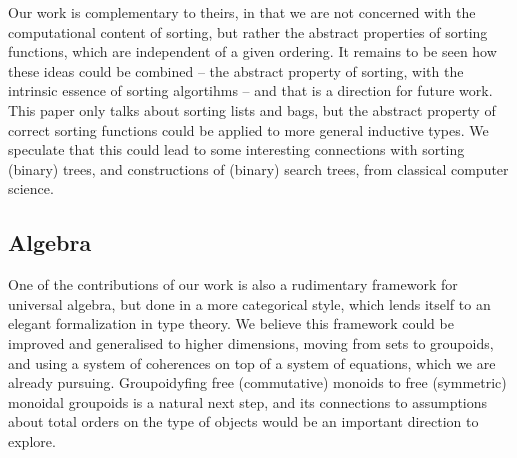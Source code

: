 Our work is complementary to theirs, in that we are not concerned with the computational content of sorting, but rather
the abstract properties of sorting functions, which are independent of a given ordering.
%
It remains to be seen how these ideas could be combined -- the abstract property of sorting, with the intrinsic essence
of sorting algortihms -- and that is a direction for future work.
%
This paper only talks about sorting lists and bags, but the abstract property of correct sorting functions could be
applied to more general inductive types. We speculate that this could lead to some interesting connections with sorting
(binary) trees, and constructions of (binary) search trees, from classical computer science.

\subsection*{Algebra}

One of the contributions of our work is also a rudimentary framework for universal algebra, but done in a more
categorical style, which lends itself to an elegant formalization in type theory.
%
We believe this framework could be improved and generalised to higher dimensions, moving from sets to groupoids,
and using a system of coherences on top of a system of equations, which we are already pursuing.
%
Groupoidyfing free (commutative) monoids to free (symmetric) monoidal groupoids is a natural next step, and its
connections to assumptions about total orders on the type of objects would be an important direction to explore.






